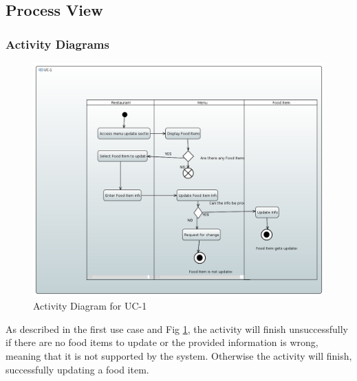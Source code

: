 \subsection{Process View}
\subsubsection{Activity Diagrams} \label{seq_diag}

\begin{figure}[h!]
\begin{center}
\includegraphics[scale=0.35]{FIGS/UC-1.PNG}
    \caption{Activity Diagram for UC-1}
    \label{fig:act_diag1}
\end{center}
\end{figure}

As described in the first use case and Fig \ref{fig:act_diag1}, the activity will finish unsuccessfully if there are no food items to update or the provided information is wrong, meaning that it is not supported by the system. Otherwise the activity will finish, successfully updating a food item.

